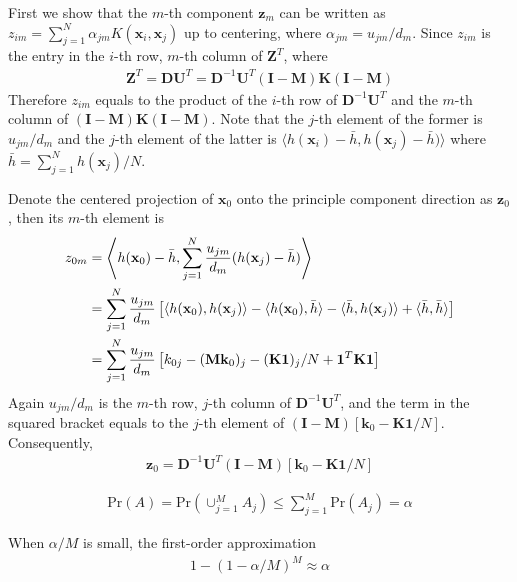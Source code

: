 \begin{exercise}
  First we show that the $m$-th component $\mathbf{z}_m$ can be written as
  $z_{im} = \sum_{j=1}^N\alpha_{jm}K(\mathbf{x}_i, \mathbf{x}_j)$ up to
  centering, where $\alpha_{jm} = u_{jm}/d_m$. Since $z_{im}$ is the entry in
  the $i$-th row, $m$-th column of $\mathbf{Z}^T$, where
  \begin{align}
    \mathbf{Z}^T = \mathbf{DU}^T = \mathbf{D}^{-1}\mathbf{U}^T(\mathbf{I} -
    \mathbf{M})\mathbf{K}(\mathbf{I} - \mathbf{M})
  \end{align}
  Therefore $z_{im}$ equals to the product of the $i$-th row of
  $\mathbf{D}^{-1}\mathbf{U}^T$ and the $m$-th column of $(\mathbf{I} -
  \mathbf{M})\mathbf{K}(\mathbf{I} - \mathbf{M})$. Note that the $j$-th element
  of the former is $u_{jm}/d_m$ and the $j$-th element of the latter is
  $\langle h(\mathbf{x}_i) - \bar{h}, h(\mathbf{x}_j) - \bar{h})\rangle$ where
  $\bar{h} = \sum_{j=1}^N h(\mathbf{x}_j) / N$.
  
  Denote the centered projection of $\mathbf{x}_0$ onto the principle component
  direction as $\mathbf{z}_0$, then its $m$-th element is
  \begin{align}
    z_{0m} & = \left\langle h(\mathbf{x}_0) - \bar{h},
    \sum_{j=1}^N\frac{u_{jm}}{d_m} (h(\mathbf{x}_j) - \bar{h})\right\rangle
    \notag \\
    & = \sum_{j=1}^N \frac{u_{jm}}{d_m}\left[\langle h(\mathbf{x}_0),
    h(\mathbf{x}_j)\rangle - \langle h(\mathbf{x}_0), \bar{h} \rangle - \langle
    \bar{h}, h(\mathbf{x}_j) \rangle + \langle \bar{h}, \bar{h} \rangle \right]
    \notag \\
    & = \sum_{j=1}^N \frac{u_{jm}}{d_m} \left[k_{0j} - (\mathbf{Mk}_0)_j -
    (\mathbf{K1})_j / N + \mathbf{1}^T\mathbf{K1} \right]
  \end{align}
  Again $u_{jm}/d_m$ is the $m$-th row, $j$-th column of
  $\mathbf{D}^{-1}\mathbf{U}^T$, and the term in the squared bracket equals to
  the $j$-th element of $(\mathbf{I} - \mathbf{M})[\mathbf{k}_0 -
  \mathbf{K1}/N]$. Consequently,
  \begin{align}
    \mathbf{z}_0 = \mathbf{D}^{-1}\mathbf{U}^T (\mathbf{I} -
    \mathbf{M})[\mathbf{k}_0 - \mathbf{K1}/N]
  \end{align}
\end{exercise}

\begin{exercise}
  \begin{exerciseSection}
    \begin{align}
      \mbox{Pr}(A) = \mbox{Pr}(\cup_{j=1}^MA_j) \leq \sum_{j=1}^M \mbox{Pr}(A_j)
      = \alpha
    \end{align}
  \end{exerciseSection}
  
  \begin{exerciseSection}
    When $\alpha/M$ is small, the first-order approximation
    \begin{align}
      1 - (1 - \alpha/M)^M \approx \alpha
    \end{align}
  \end{exerciseSection}
\end{exercise}

